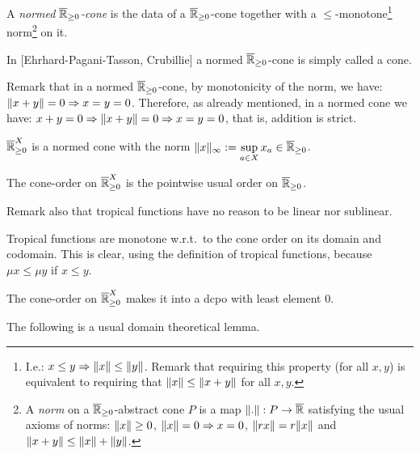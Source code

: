 \begin{definition}
 A \emph{normed $\overline{\mathbb{R}}_{\geq 0}$-cone} is the data of a $\overline{\mathbb{R}}_{\geq 0}$-cone together with a $\leq$-monotone\footnote{I.e.: $x\leq y \Rightarrow \lVert x\rVert\leq \lVert y\rVert$. Remark that requiring this property (for all $x,y$) is equivalent to requiring that $\lVert x\rVert\leq \lVert x+y\rVert$ for all $x,y$.} norm\footnote{A \emph{norm} on a $\overline{\mathbb{R}}_{\geq 0}$-abstract cone $P$ is a map $\lVert.\rVert:P\to \overline{\mathbb{R}}$ satisfying the usual axioms of norms:
 $\lVert x\rVert \geq 0$, $\lVert x\rVert = 0 \Rightarrow x=0$, $\lVert rx\rVert=r\lVert x\rVert$ and $\lVert x+y\rVert\leq \lVert x\rVert + \lVert y\rVert$.} on it.
\end{definition}

In [Ehrhard-Pagani-Tasson, Crubillie] a normed $\overline{\mathbb{R}}_{\geq 0}$-cone is simply called a cone.

Remark that in a normed $\overline{\mathbb{R}}_{\geq 0}$-cone, by monotonicity of the norm, we have: $\lVert x+y\rVert=0 \Rightarrow x=y=0$.
Therefore, as already mentioned, in a normed cone we have: 
$x+y=0 \Rightarrow \lVert x+y\rVert=0 \Rightarrow x=y=0$, that is, addition is strict.

\begin{example}
 $\overline{\mathbb{R}}_{\geq 0}^X$ is a normed cone with the norm $\lVert x\rVert_\infty:=\sup\limits_{a\in X} x_a\in \overline{\mathbb{R}}_{\geq 0}$.
\end{example}

\begin{remark}
 The cone-order on $\overline{\mathbb{R}}_{\geq 0}^X$ is the pointwise usual order on $\overline{\mathbb{R}}_{\geq 0}$.
 
 Remark also that tropical functions have no reason to be linear nor sublinear.
\end{remark}

\begin{remark}\label{rmk:tropMonot}
 Tropical functions are monotone w.r.t.\ to the cone order on its domain and codomain.
 This is clear, using the definition of tropical functions, because $\mu x\leq \mu y$ if $x\leq y$.
\end{remark}

\begin{remark}
 The cone-order on $\overline{\mathbb{R}}_{\geq 0}^X$ makes it into a dcpo with least element $0$.
\end{remark}

The following is a usual domain theoretical lemma.

